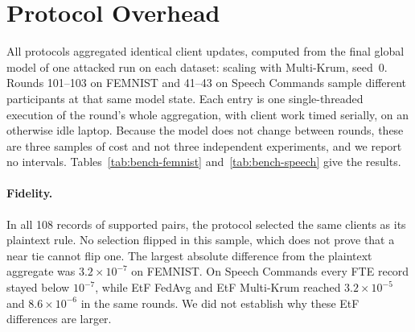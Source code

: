 \section{Protocol Overhead}
\label{sec:overhead}

All protocols aggregated identical client updates, computed from the final global model of one attacked run on each dataset: scaling with Multi-Krum, seed~0. Rounds 101--103 on FEMNIST and 41--43 on Speech Commands sample different participants at that same model state. Each entry is one single-threaded execution of the round's whole aggregation, with client work timed serially, on an otherwise idle laptop. Because the model does not change between rounds, these are three samples of cost and not three independent experiments, and we report no intervals. Tables~\ref{tab:bench-femnist} and~\ref{tab:bench-speech} give the results.

\begin{table}[H]
\centering
\caption{FEMNIST protocol cost per round: 20 clients, 161{,}438-dimensional updates, $f=4$. Time is the mean $\pm$ sample standard deviation over 3 rounds. Traffic is the sum of recorded payloads. ``Malicious kept'' counts participants the rule kept; trimmed mean and FedAvg keep all clients by construction, so it says nothing about their robustness.}
\label{tab:bench-femnist}
\resizebox{\linewidth}{!}{}
\end{table}

\begin{table}[H]
\centering
\caption{Speech Commands protocol cost per round: 11 clients, BC-ResNet-8 updates, $f=2$. Columns as in Table~\ref{tab:bench-femnist}.}
\label{tab:bench-speech}
\resizebox{\linewidth}{!}{}
\end{table}

\paragraph{Fidelity.}
In all 108 records of supported pairs, the protocol selected the same clients as its plaintext rule. No selection flipped in this sample, which does not prove that a near tie cannot flip one. The largest absolute difference from the plaintext aggregate was $3.2\times10^{-7}$ on FEMNIST. On Speech Commands every FTE record stayed below $10^{-7}$, while EtF FedAvg and EtF Multi-Krum reached $3.2\times10^{-5}$ and $8.6\times10^{-6}$ in the same rounds. We did not establish why these EtF differences are larger.

